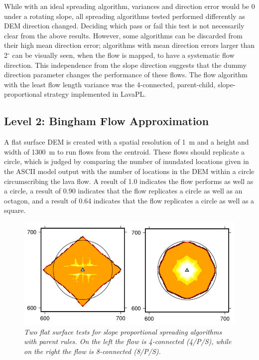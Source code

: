 \documentclass[12pt,letter]{article}
\begin{document}
		While with an ideal spreading algorithm, variances and direction error would be 0 under a rotating slope, all spreading algorithms tested performed differently as DEM direction changed. Deciding which pass or fail this test is not necessarily clear from the above results. However, some algorithms can be discarded from their high mean direction error; algorithms with mean direction errors larger than 2$^{\circ}$ can be visually seen, when the flow is mapped, to have a systematic flow direction. This independence from the slope direction suggests that the dummy direction parameter changes the performance of these flows. The flow algorithm with the least flow length variance was the 4-connected, parent-child, slope-proportional strategy implemented in LavaPL.

	\subsection{Level 2: Bingham Flow Approximation}
		
		A flat surface DEM is created with a spatial resolution of 1~m and a height and width of 1300~m to run flows from the centroid. These flows should replicate a circle, which is judged by comparing the number of inundated locations given in the ASCII model output with the number of locations in the DEM within a circle circumscribing the lava flow. A result of 1.0 indicates the flow performs as well as a circle, a result of 0.90 indicates that the flow replicates a circle as well as an octagon, and a result of 0.64 indicates that the flow replicates a circle as well as a square.
		
		\begin{figure}[!h]
		\centering
		\includegraphics[width=0.7\linewidth]{pancake}
		\caption{\textit{Two flat surface tests for slope proportional spreading algorithms with parent rules. On the left the flow is 4-connected (4/P/S), while on the right the flow is 8-connected (8/P/S).}}
		\label{fig:pancake}
	\end{figure}
	
\end{document}

